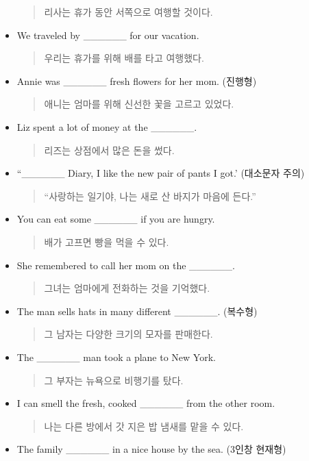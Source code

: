 \documentclass{article}
\begin{document}
\begin{addmargin}[1em]{1em}
\begin{itemize}
\begin{quote}
    리사는 휴가 동안 서쪽으로 여행할 것이다.
    \end{quote}
    \item We traveled by \_\_\_\_\_\_ for our vacation.
    \begin{quote}
    우리는 휴가를 위해 배를 타고 여행했다.
    \end{quote}
    \item Annie was \_\_\_\_\_\_ fresh flowers for her mom. (진행형)
    \begin{quote}
    애니는 엄마를 위해 신선한 꽃을 고르고 있었다.
    \end{quote}
    \item Liz spent a lot of money at the \_\_\_\_\_\_.
    \begin{quote}
    리즈는 상점에서 많은 돈을 썼다.
    \end{quote}
    \item ``\_\_\_\_\_\_ Diary, I like the new pair of pants I got.' (대소문자 주의)
    \begin{quote}
    ``사랑하는 일기야, 나는 새로 산 바지가 마음에 든다.''
    \end{quote}
    \item You can eat some \_\_\_\_\_\_ if you are hungry.
    \begin{quote}
    배가 고프면 빵을 먹을 수 있다.
    \end{quote}
    \item She remembered to call her mom on the \_\_\_\_\_\_.
    \begin{quote}
    그녀는 엄마에게 전화하는 것을 기억했다.
    \end{quote}
    \item The man sells hats in many different \_\_\_\_\_\_. (복수형)
    \begin{quote}
    그 남자는 다양한 크기의 모자를 판매한다.
    \end{quote}
    \item The \_\_\_\_\_\_ man took a plane to New York.
    \begin{quote}
    그 부자는 뉴욕으로 비행기를 탔다.
    \end{quote}
    \item I can smell the fresh, cooked \_\_\_\_\_\_ from the other room.
    \begin{quote}
    나는 다른 방에서 갓 지은 밥 냄새를 맡을 수 있다.
    \end{quote}
    \item The family \_\_\_\_\_\_ in a nice house by the sea. (3인창 현재형)
    \begin{quote}

\end{quote}
\end{itemize}
\end{addmargin}
\end{document}
